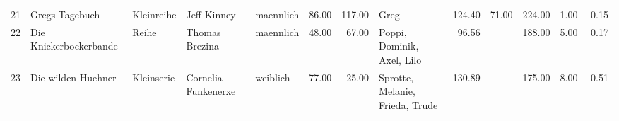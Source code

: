 \begin{sidewaystable}[ht]
\begin{center}
{\begin{tabular}{rllllrrlrrrrr}
  21 & Gregs Tagebuch                                                                                                                                                                                                                                                  & Kleinreihe & Jeff Kinney                                                                                                                                                                                                                                                     & maennlich & 86.00 & 117.00 & Greg                                                                                                                                                                                                                                                            & 124.40 & 71.00 & 224.00 & 1.00 & 0.15 \\ 
  22 & Die Knickerbockerbande                                                                                                                                                                                                                                          & Reihe & Thomas Brezina                                                                                                                                                                                                                                                  & maennlich & 48.00 & 67.00 & Poppi, Dominik, Axel, Lilo                                                                                                                                                                                                                                      & 96.56 &  & 188.00 & 5.00 & 0.17 \\ 
  23 & Die wilden Huehner                                                                                                                                                                                                                                              & Kleinserie & Cornelia Funkenerxe                                                                                                                                                                                                                                             & weiblich & 77.00 & 25.00 & Sprotte, Melanie, Frieda, Trude                                                                                                                                                                                                                                 & 130.89 &  & 175.00 & 8.00 & -0.51 \\ 

\end{tabular}}
\end{center}
\end{sidewaystable}
